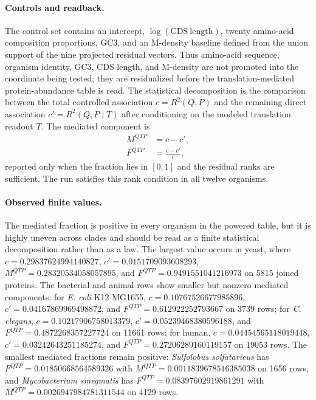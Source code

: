 \paragraph{Controls and readback.}
The control set contains an intercept, $\log(\mathrm{CDS\ length})$, twenty amino-acid composition proportions, GC3, and an M-density baseline defined from the union support of the nine projected residual vectors.  Thus amino-acid sequence, organism identity, GC3, CDS length, and M-density are not promoted into the coordinate being tested; they are residualized before the translation-mediated protein-abundance table is read.  The statistical decomposition is the comparison between the total controlled association $c=R^2(Q,P)$ and the remaining direct association $c'=R^2(Q,P\mid T)$ after conditioning on the modeled translation readout $T$.  The mediated component is
$$
\begin{aligned}
M^{QTP} &= c-c',\\
F^{QTP} &= \frac{c-c'}{c},
\end{aligned}
$$
reported only when the fraction lies in $[0,1]$ and the residual ranks are sufficient.  The run satisfies this rank condition in all twelve organisms.

\paragraph{Observed finite values.}
The mediated fraction is positive in every organism in the powered table, but it is highly uneven across clades and should be read as a finite statistical decomposition rather than as a law.  The largest value occurs in yeast, where $c=0.29837624994140827$, $c'=0.0151709093608293$, $M^{QTP}=0.28320534058057895$, and $F^{QTP}=0.9491551041216973$ on 5815 joined proteins.  The bacterial and animal rows show smaller but nonzero mediated components: for \emph{E. coli} K12 MG1655, $c=0.10767526677985896$, $c'=0.04167869969498872$, and $F^{QTP}=0.612922252793667$ on 3739 rows; for \emph{C. elegans}, $c=0.10217906758013379$, $c'=0.05239468380596188$, and $F^{QTP}=0.4872268357227724$ on 11661 rows; for human, $c=0.04454565118019448$, $c'=0.03242643251185274$, and $F^{QTP}=0.27206289160119157$ on 19053 rows.  The smallest mediated fractions remain positive: \emph{Sulfolobus solfataricus} has $F^{QTP}=0.01850668564589326$ with $M^{QTP}=0.0011839678516385038$ on 1656 rows, and \emph{Mycobacterium smegmatis} has $F^{QTP}=0.08397602919861291$ with $M^{QTP}=0.0026947984781311544$ on 4129 rows.

